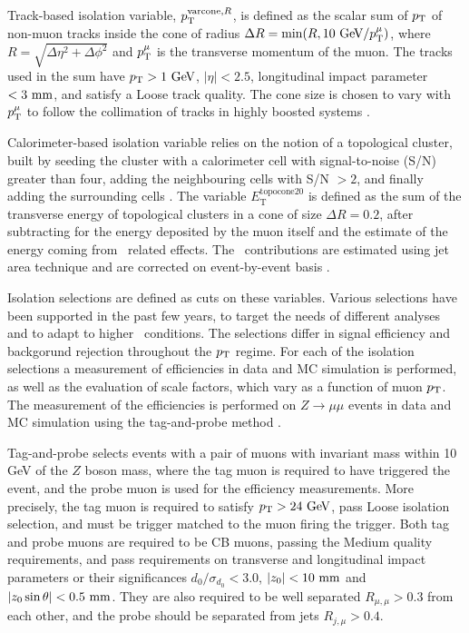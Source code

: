 Track-based isolation variable, $p_{\text{T}}^{\text{varcone}, R}$, is defined
as the scalar sum of $p_{\text{T}}$ of non-muon tracks inside the cone of radius
$\Delta R = \min(R, 10~\text{Ge\kern -0.1em V}/p_{\text{T}}^\mu)$, where $R = \sqrt{\Delta \eta^2 +
\Delta \phi^2}$ and $p_{\text{T}}^\mu$ is the transverse momentum of the muon.
The tracks used in the sum have $p_{\text{T}} > 1~\text{Ge\kern -0.1em V}$,
$|\eta| < 2.5$, longitudinal impact parameter $< 3~\text{mm}$, and satisfy a
Loose track quality. The cone size is chosen to vary with $p_{\text{T}}^\mu$
to follow the collimation of tracks in highly boosted systems \cite{Aad:2016jkr}.

Calorimeter-based isolation variable relies on the notion of a topological
cluster, built by seeding the cluster with a calorimeter cell with
signal-to-noise (S/N) greater than four, adding the neighbouring cells with
S/N $ > 2$, and finally adding the surrounding cells \cite{Aad:2011he}. The
variable $E_\text{T}^\text{topocone20}$ is defined as the sum of
the transverse energy of topological clusters in a cone of size $\Delta
R = 0.2$, after subtracting for the energy deposited by the muon itself
and the estimate of the energy coming from \pileup~related effects. The
\pileup~contributions are estimated using jet area technique \cite{CACCIARI2008119}
and are corrected on event-by-event basis \cite{Aad:2016jkr}.

Isolation selections are defined as cuts on these variables. Various
selections have been supported in the past few years, to target the needs
of different analyses and to adapt to higher \pileup~conditions. The 
selections differ in signal efficiency and backgorund rejection
throughout the $p_{\text{T}}$ regime. For each of the isolation selections a
measurement of efficiencies in data and MC simulation is performed, as
well as the evaluation of scale factors, which vary as a function
of muon $p_{\text{T}}$. The measurement of the efficiencies is performed on
$Z\rightarrow\mu\mu$ events in data and MC simulation using the
tag-and-probe method \cite{Aad:2016jkr}.

Tag-and-probe selects events with a pair of muons with invariant mass
within 10 GeV of the $Z$ boson mass, where the tag muon is required to
have triggered the event, and the probe muon is used for the efficiency
measurements. More precisely, the tag muon is required to satisfy
$p_{\text{T}} > 24~\text{Ge\kern -0.1em V}$, pass Loose isolation selection, and must be trigger
matched to the muon firing the trigger. Both tag and probe muons are
required to be CB muons, passing the Medium quality requirements,
and pass requirements on transverse and longitudinal impact parameters
or their significances $d_0/\sigma_{d_0} < 3.0$, $|z_0| < 10~\text{mm}$ and
$|z_0 \sin{\theta}| < 0.5~\text{mm}$. They are also required to be well
separated $R_{\mu,\mu} > 0.3$ from each other, and the probe should
be separated from jets $R_{j,\mu} > 0.4$.


